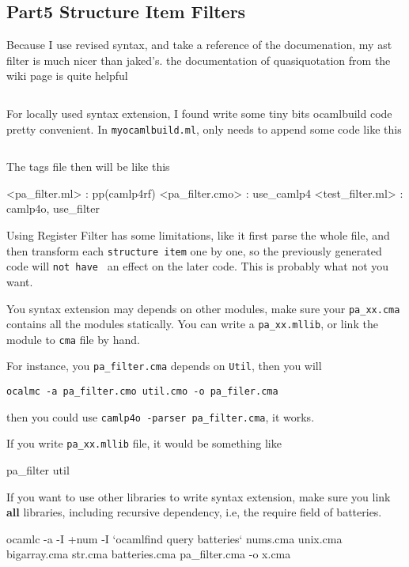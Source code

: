 \subsection{Part5 Structure Item Filters}
Because I use revised syntax, and take a reference of the
documenation, my ast filter is much nicer than jaked's.  the
documentation of quasiquotation from the wiki page is quite helpful

\inputminted[fontsize=\scriptsize, ]{ocaml}{camlp4/code/jake/pa_filter.ml}

For locally used syntax extension, I found write some tiny bits
ocamlbuild code pretty convenient. In \verb|myocamlbuild.ml|, only
needs to append some code like this

\inputminted[fontsize=\scriptsize, firstline=101,lastline=112]{ocaml}{camlp4/code/jake/myocamlbuild.ml}

The tags file then will be like this 
\begin{bluetext}
<pa_filter.{ml}> : pp(camlp4rf)
<pa_filter.{cmo}> : use_camlp4
<test_filter.ml> : camlp4o, use_filter
\end{bluetext}

Using Register Filter has some limitations, like it first parse the
whole file, and then transform each \verb|structure item| one by one,
so the previously generated code will \verb|not have | an effect on
the later code. This is probably what not you want.


You syntax extension may depends on other modules, make sure your
\verb|pa_xx.cma| contains all the modules statically. You can write a
\verb|pa_xx.mllib|, or link the module to \verb|cma| file by hand.

For instance, you \verb|pa_filter.cma| depends on \verb|Util|, then
you will 

\verb|ocalmc -a pa_filter.cmo util.cmo -o pa_filer.cma|

then you could use \verb|camlp4o -parser pa_filter.cma|, it works.

If you write \verb|pa_xx.mllib| file, it would be something like

\begin{bluetext}
pa_filter
util
\end{bluetext}
If you want to use other libraries to write syntax extension, make
sure you link \textbf{all} libraries, including recursive dependency,
i.e, the require field of batteries.
\begin{bluetext}
ocamlc -a  -I +num -I `ocamlfind query batteries` nums.cma unix.cma
bigarray.cma str.cma batteries.cma pa_filter.cma -o x.cma
\end{bluetext}


